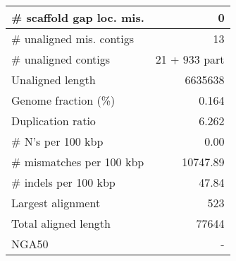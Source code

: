 \documentclass[12pt,a4paper]{article}
\begin{document}
\begin{table}[ht]
\begin{center}
\begin{tabular}{|l*{1}{|r}|}
\# scaffold gap loc. mis. & 0 \\ \hline
\# unaligned mis. contigs & 13 \\ \hline
\# unaligned contigs & 21 + 933 part \\ \hline
Unaligned length & 6635638 \\ \hline
Genome fraction (\%) & 0.164 \\ \hline
Duplication ratio & 6.262 \\ \hline
\# N's per 100 kbp & 0.00 \\ \hline
\# mismatches per 100 kbp & 10747.89 \\ \hline
\# indels per 100 kbp & 47.84 \\ \hline
Largest alignment & 523 \\ \hline
Total aligned length & 77644 \\ \hline
NGA50 & - \\ \hline
\end{tabular}
\end{center}
\end{table}
\end{document}
